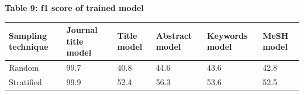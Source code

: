 \documentclass[
]{article}
\begin{document}
\newpage

\textbf{Table 9: f1 score of trained model}

\begin{longtable}[]{@{}llllll@{}}
\toprule
\begin{minipage}[b]{0.14\columnwidth}\raggedright
Sampling technique\strut
\end{minipage} & \begin{minipage}[b]{0.14\columnwidth}\raggedright
Journal title model\strut
\end{minipage} & \begin{minipage}[b]{0.14\columnwidth}\raggedright
Title model\strut
\end{minipage} & \begin{minipage}[b]{0.14\columnwidth}\raggedright
Abstract model\strut
\end{minipage} & \begin{minipage}[b]{0.14\columnwidth}\raggedright
Keywords model\strut
\end{minipage} & \begin{minipage}[b]{0.14\columnwidth}\raggedright
MeSH model\strut
\end{minipage}\tabularnewline
\midrule
\endhead
\begin{minipage}[t]{0.14\columnwidth}\raggedright
Random ~\strut
\end{minipage} & \begin{minipage}[t]{0.14\columnwidth}\raggedright
99.7\strut
\end{minipage} & \begin{minipage}[t]{0.14\columnwidth}\raggedright
40.8\strut
\end{minipage} & \begin{minipage}[t]{0.14\columnwidth}\raggedright
44.6\strut
\end{minipage} & \begin{minipage}[t]{0.14\columnwidth}\raggedright
43.6\strut
\end{minipage} & \begin{minipage}[t]{0.14\columnwidth}\raggedright
42.8\strut
\end{minipage}\tabularnewline
\begin{minipage}[t]{0.14\columnwidth}\raggedright
Stratified\strut
\end{minipage} & \begin{minipage}[t]{0.14\columnwidth}\raggedright
99.9\strut
\end{minipage} & \begin{minipage}[t]{0.14\columnwidth}\raggedright
52.4\strut
\end{minipage} & \begin{minipage}[t]{0.14\columnwidth}\raggedright
56.3\strut
\end{minipage} & \begin{minipage}[t]{0.14\columnwidth}\raggedright
53.6\strut
\end{minipage} & \begin{minipage}[t]{0.14\columnwidth}\raggedright
52.5\strut
\end{minipage}\tabularnewline
\bottomrule
\end{longtable}
\end{document}
